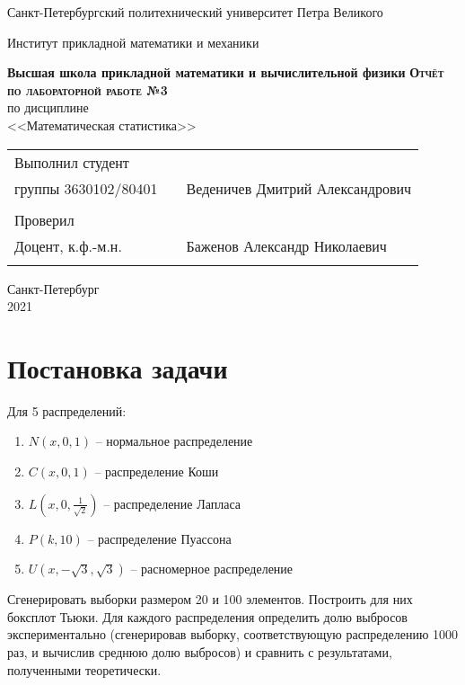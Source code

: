 \documentclass[a4paper]{article}
\begin{document}
\begin{titlepage}
  \begin{center}
    \large
    Санкт-Петербургский политехнический университет Петра Великого
    
    Институт прикладной математики и механики
    
    \textbf{Высшая школа прикладной математики и вычислительной физики}
    \vfill
    \textsc{\textbf{\large{Отчёт по лабораторной работе №3}}}\\[5mm]
     по дисциплине\\ <<Математическая статистика>>\\
\end{center}

\vfill

\begin{tabular}{l p{} l}
Выполнил студент \\группы 3630102/80401 && Веденичев Дмитрий Александрович \\
\\
Проверил\\Доцент, к.ф.-м.н.& \hspace{0pt} &   Баженов Александр Николаевич \\\\
\end{tabular}

\hfill \break
\hfill \break
\begin{center} Санкт-Петербург \\2021 \end{center}
\thispagestyle{empty}
\end{titlepage}
\newpage
\newpage
\begin{center}
    \setcounter{page}{2}
    \tableofcontents
\end{center}
\newpage
\begin{center}
    \setcounter{page}{3}
    \listoffigures
\end{center}

\newpage
\section {Постановка задачи}
\noindent Для 5 распределений:
\begin{enumerate}
	\item $N(x, 0, 1)$ -- нормальное распределение
	\item $C(x, 0, 1)$ -- распределение Коши
	\item $L(x, 0, \frac{1}{\sqrt{2}})$ -- распределение Лапласа 
	\item $P(k, 10)$ -- распределение Пуассона
	\item $U(x, -\sqrt{3}, \sqrt{3})$ -- расномерное распределение
\end{enumerate}
Сгенерировать выборки размером 20 и 100 элементов.
Построить для них боксплот Тьюки.
Для каждого распределения определить долю выбросов экспериментально (сгенерировав выборку, соответствующую распределению 1000 раз, и вычислив среднюю долю выбросов) и сравнить с результатами, полученными теоретически.
\end{document}
